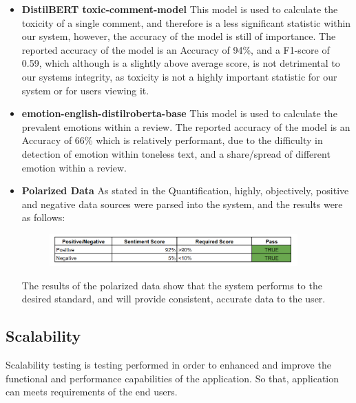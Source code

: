 \documentclass[12pt]{article}
\begin{document}
\begin{itemize}
    \item \textbf{DistilBERT toxic-comment-model} This model is used to calculate the toxicity of a single comment, and therefore is a less significant statistic within our system, however, the accuracy of the model is still of importance. The reported accuracy of the model is an Accuracy of 94\%, and a F1-score of 0.59, which although is a slightly above average score, is not detrimental to our systems integrity, as toxicity is not a highly important statistic for our system or for users viewing it.
    \item \textbf{emotion-english-distilroberta-base} This model is used to calculate the prevalent emotions within a review. The reported accuracy of the model is an Accuracy of 66\% which is relatively performant, due to the difficulty in detection of emotion within toneless text, and a share/spread of different emotion within a review.
    \item \textbf{Polarized Data} As stated in the Quantification, highly, objectively, positive and negative data sources were parsed into the system, and the results were as follows:
          \begin{figure}[H]
              \centering
              \includegraphics[width=0.9\textwidth]{PositiveAndNegative.png}
          \end{figure}
          The results of the polarized data show that the system performs to the desired standard, and will provide consistent, accurate data to the user.
\end{itemize}
\newpage
\subsection{Scalability}
Scalability testing is testing performed in order to enhanced and improve the functional and performance capabilities of the application. So that, application can meets requirements of the end users.
\end{document}
